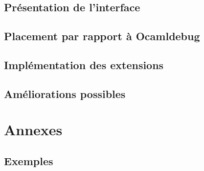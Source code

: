 \documentclass[11pt,a4paper]{report}
\begin{document}

\section{Présentation de l'interface}
\section{Placement par rapport à Ocamldebug}
\section{Implémentation des extensions}
\section{Améliorations possibles}


\chapter{Annexes}

\section{Exemples}
\end{document}
